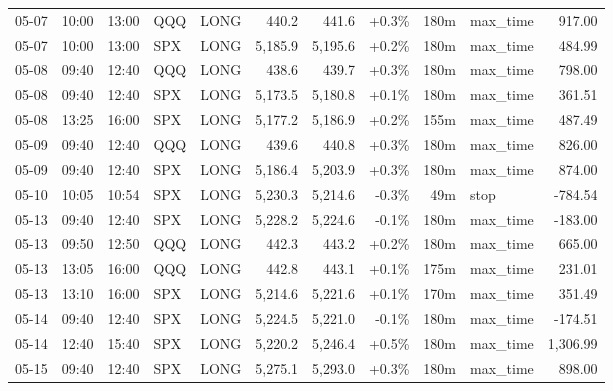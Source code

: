 \documentclass[11pt,a4paper,twoside]{article}
\begin{document}
\begin{center}
\begin{longtable}{>{\color{txtmain}}l l l l l r r r r >{\color{txtmain}}l r}
05-07 & 10:00 & 13:00 & QQQ & LONG & 440.2 & 441.6 & \textcolor{wingreen}{+0.3\%} & 180m & max\_time & \textcolor{wingreen}{917.00} \\
05-07 & 10:00 & 13:00 & SPX & LONG & 5,185.9 & 5,195.6 & \textcolor{wingreen}{+0.2\%} & 180m & max\_time & \textcolor{wingreen}{484.99} \\
05-08 & 09:40 & 12:40 & QQQ & LONG & 438.6 & 439.7 & \textcolor{wingreen}{+0.3\%} & 180m & max\_time & \textcolor{wingreen}{798.00} \\
05-08 & 09:40 & 12:40 & SPX & LONG & 5,173.5 & 5,180.8 & \textcolor{wingreen}{+0.1\%} & 180m & max\_time & \textcolor{wingreen}{361.51} \\
05-08 & 13:25 & 16:00 & SPX & LONG & 5,177.2 & 5,186.9 & \textcolor{wingreen}{+0.2\%} & 155m & max\_time & \textcolor{wingreen}{487.49} \\
05-09 & 09:40 & 12:40 & QQQ & LONG & 439.6 & 440.8 & \textcolor{wingreen}{+0.3\%} & 180m & max\_time & \textcolor{wingreen}{826.00} \\
05-09 & 09:40 & 12:40 & SPX & LONG & 5,186.4 & 5,203.9 & \textcolor{wingreen}{+0.3\%} & 180m & max\_time & \textcolor{wingreen}{874.00} \\
05-10 & 10:05 & 10:54 & SPX & LONG & 5,230.3 & 5,214.6 & \textcolor{lossred}{-0.3\%} & 49m & stop & \textcolor{lossred}{-784.54} \\
05-13 & 09:40 & 12:40 & SPX & LONG & 5,228.2 & 5,224.6 & \textcolor{lossred}{-0.1\%} & 180m & max\_time & \textcolor{lossred}{-183.00} \\
05-13 & 09:50 & 12:50 & QQQ & LONG & 442.3 & 443.2 & \textcolor{wingreen}{+0.2\%} & 180m & max\_time & \textcolor{wingreen}{665.00} \\
05-13 & 13:05 & 16:00 & QQQ & LONG & 442.8 & 443.1 & \textcolor{wingreen}{+0.1\%} & 175m & max\_time & \textcolor{wingreen}{231.01} \\
05-13 & 13:10 & 16:00 & SPX & LONG & 5,214.6 & 5,221.6 & \textcolor{wingreen}{+0.1\%} & 170m & max\_time & \textcolor{wingreen}{351.49} \\
05-14 & 09:40 & 12:40 & SPX & LONG & 5,224.5 & 5,221.0 & \textcolor{lossred}{-0.1\%} & 180m & max\_time & \textcolor{lossred}{-174.51} \\
05-14 & 12:40 & 15:40 & SPX & LONG & 5,220.2 & 5,246.4 & \textcolor{wingreen}{+0.5\%} & 180m & max\_time & \textcolor{wingreen}{1,306.99} \\
05-15 & 09:40 & 12:40 & SPX & LONG & 5,275.1 & 5,293.0 & \textcolor{wingreen}{+0.3\%} & 180m & max\_time & \textcolor{wingreen}{898.00} \\

\end{longtable}
\end{center}
\end{document}
